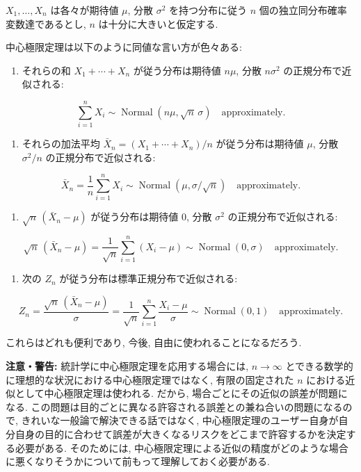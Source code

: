 \documentclass[
  letterpaper,
  DIV=11,
  numbers=noendperiod]{scrartcl}
\providecommand{\tightlist}{%
  \setlength{\itemsep}{0pt}\setlength{\parskip}{0pt}}\usepackage{longtable,booktabs,array}
\begin{document}
\(X_1,\ldots,X_n\) は各々が期待値 \(\mu\), 分散 \(\sigma^2\)
を持つ分布に従う \(n\) 個の独立同分布確率変数達であるとし, \(n\)
は十分に大きいと仮定する.

中心極限定理は以下のように同値な言い方が色々ある:

\begin{enumerate}
\def\labelenumi{(\arabic{enumi})}
\tightlist
\item
  それらの和 \(X_1+\cdots+X_n\) が従う分布は期待値 \(n\mu\), 分散
  \(n\sigma^2\) の正規分布で近似される:
\end{enumerate}

\[
\sum_{i=1}^n X_i
\sim \operatorname{Normal}\left(n\mu, \sqrt{n}\,\sigma\right)\quad\text{approximately}.
\]

\begin{enumerate}
\def\labelenumi{(\arabic{enumi})}
\setcounter{enumi}{1}
\tightlist
\item
  それらの加法平均 \(\bar{X}_n = (X_1+\cdots+X_n)/n\) が従う分布は期待値
  \(\mu\), 分散 \(\sigma^2/n\) の正規分布で近似される:
\end{enumerate}

\[
\bar{X}_n = \frac{1}{n}\sum_{i=1}^n X_i
\sim \operatorname{Normal}\left(\mu, \sigma/\sqrt{n}\right)\quad\text{approximately}.
\]

\begin{enumerate}
\def\labelenumi{(\arabic{enumi})}
\setcounter{enumi}{2}
\tightlist
\item
  \(\sqrt{n}\,(\bar{X}_n - \mu)\) が従う分布は期待値 \(0\), 分散
  \(\sigma^2\) の正規分布で近似される:
\end{enumerate}

\[
\sqrt{n}\,(\bar{X}_n - \mu) =
\frac{1}{\sqrt{n}}\sum_{i=1}^n (X_i - \mu)
\sim \operatorname{Normal}(0, \sigma)\quad\text{approximately}.
\]

\begin{enumerate}
\def\labelenumi{(\arabic{enumi})}
\setcounter{enumi}{3}
\tightlist
\item
  次の \(Z_n\) が従う分布は標準正規分布で近似される:
\end{enumerate}

\[
Z_n = \frac{\sqrt{n}\,(\bar{X}_n - \mu)}{\sigma} =
\frac{1}{\sqrt{n}}\sum_{i=1}^n \frac{X_i - \mu}{\sigma}
\sim \operatorname{Normal}(0, 1)\quad\text{approximately}.
\]

これらはどれも便利であり, 今後, 自由に使われることになるだろう.

\textbf{注意・警告:} 統計学に中心極限定理を応用する場合には,
\(n\to\infty\) とできる数学的に理想的な状況における中心極限定理ではなく,
有限の固定された \(n\) における近似として中心極限定理は使われる. だから,
場合ごとにその近似の誤差が問題になる.
この問題は目的ごとに異なる許容される誤差との兼ね合いの問題になるので,
きれいな一般論で解決できる話ではなく,
中心極限定理のユーザー自身が自分自身の目的に合わせて誤差が大きくなるリスクをどこまで許容するかを決定する必要がある.
そのためには,
中心極限定理による近似の精度がどのような場合に悪くなりそうかについて前もって理解しておく必要がある.
\end{document}
